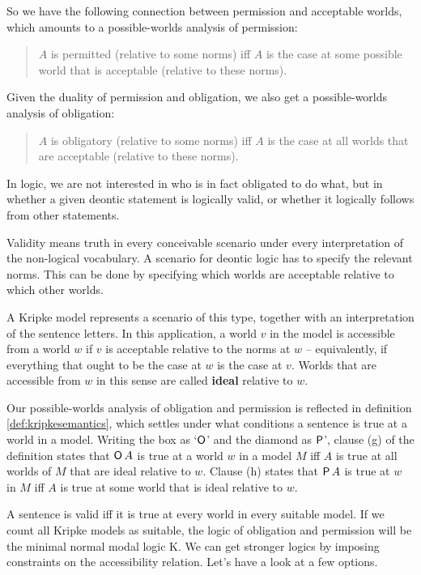 So we have the following connection between permission and acceptable worlds,
which amounts to a possible-worlds analysis of permission:
\begin{quote}
  $A$ is permitted (relative to some norms) iff $A$ is the case at
  some possible world that is acceptable (relative to these norms).
\end{quote}
%
Given the duality of permission and obligation, we also get a possible-worlds
analysis of obligation:
%
\begin{quote}
  $A$ is obligatory (relative to some norms) iff $A$ is the case at
  all worlds that are acceptable (relative to these norms).
\end{quote}

In logic, we are not interested in who is in fact obligated to do what, but in
whether a given deontic statement is logically valid, or whether it logically
follows from other statements.

Validity means truth in every conceivable scenario under every interpretation of
the non-logical vocabulary. A scenario for deontic logic has to specify the
relevant norms. This can be done by specifying which worlds are acceptable
relative to which other worlds.

A Kripke model represents a scenario of this type, together with an
interpretation of the sentence letters. In this application, a world $v$ in the
model is accessible from a world $w$ if $v$ is acceptable relative to the norms
at $w$ -- equivalently, if everything that ought to be the case at $w$ is the
case at $v$. Worlds that are accessible from $w$ in this sense are called
\textbf{ideal} relative to $w$.

Our possible-worlds analysis of obligation and permission is reflected in
definition \ref{def:kripkesemantics}, which settles under what conditions a
sentence is true at a world in a model. Writing the box as `$\operatorname{\mathsf{O}}$' and the
diamond as $\operatorname{\mathsf{P}}$', clause (g) of the definition states that $\operatorname{\mathsf{O}} A$ is true at a
world $w$ in a model $M$ iff $A$ is true at all worlds of $M$ that are ideal
relative to $w$. Clause (h) states that $\operatorname{\mathsf{P}} A$ is true at $w$ in $M$ iff $A$ is
true at some world that is ideal relative to $w$.

A sentence is valid iff it is true at every world in every suitable model. If we
count all Kripke models as suitable, the logic of obligation and permission will
be the minimal normal modal logic K. We can get stronger logics by imposing
constraints on the accessibility relation. Let's have a look at a few options.

